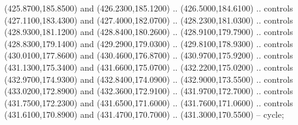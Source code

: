 {\begin{scope}[y=0.80pt, x=0.80pt, yscale=-1, xscale=1, inner sep=0pt, outer sep=0pt, #1]
      (425.8700,185.8500) and (426.2300,185.1200) .. (426.5000,184.6100) .. controls
      (427.1100,183.4300) and (427.4000,182.0700) .. (428.2300,181.0300) .. controls
      (428.9300,181.1200) and (428.8400,180.2600) .. (428.9100,179.7900) .. controls
      (428.8300,179.1400) and (429.2900,179.0300) .. (429.8100,178.9300) .. controls
      (430.0100,177.8600) and (430.4600,176.8700) .. (430.9700,175.9200) .. controls
      (431.1300,175.3400) and (431.6600,175.0700) .. (432.2200,175.0200) .. controls
      (432.9700,174.9300) and (432.8400,174.0900) .. (432.9000,173.5500) .. controls
      (433.0200,172.8900) and (432.3600,172.9100) .. (431.9700,172.7000) .. controls
      (431.7500,172.2300) and (431.6500,171.6000) .. (431.7600,171.0600) .. controls
      (431.6100,170.8900) and (431.4700,170.7000) .. (431.3000,170.5500) -- cycle;


\end{scope}}
